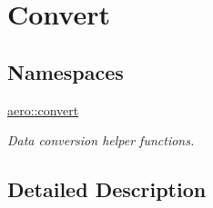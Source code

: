 \hypertarget{group__convert}{}\section{Convert}
\label{group__convert}
\subsection*{Namespaces}
\begin{DoxyCompactItemize}
\item 
 \hyperlink{namespaceaero_1_1convert}{aero\+::convert}
\begin{DoxyCompactList}\small\item\em Data conversion helper functions. \end{DoxyCompactList}\end{DoxyCompactItemize}


\subsection{Detailed Description}
